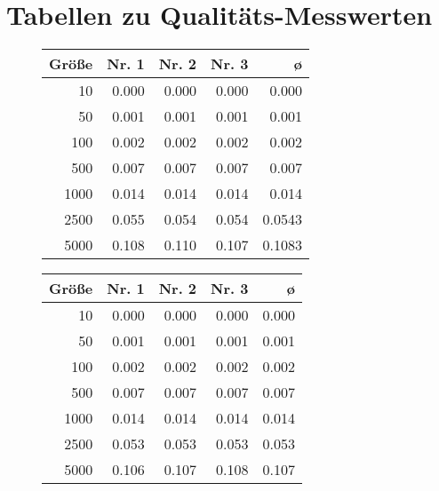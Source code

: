 \documentclass[a4paper, 10pt, twoside, onecolumn, parskip]{scrartcl}
\begin{document}
    \section{Tabellen zu Qualitäts-Messwerten} \label{sec:app_qualität2}
    \begin{figure}[H]
        \begin{minipage}{.45\textwidth}
            \begin{center}
                \begin{tabular}{|r|r|r|r|r|}
                    \hline
                    Größe & Nr. 1 & Nr. 2 & Nr. 3 & ø \\\hline
                    10 & 0.000 & 0.000 & 0.000 & 0.000 \\\hline
                    50 & 0.001 & 0.001 & 0.001 & 0.001 \\\hline
                    100 & 0.002 & 0.002 & 0.002 & 0.002 \\\hline
                    500 & 0.007 & 0.007 & 0.007 & 0.007 \\\hline
                    1000 & 0.014 & 0.014 & 0.014 & 0.014 \\\hline
                    2500 & 0.055 & 0.054 & 0.054 & 0.0543 \\\hline
                    5000 & 0.108 & 0.110 & 0.107 & 0.1083 \\\hline
                \end{tabular}
            \end{center}
        \end{minipage}\hfill%
        \begin{minipage}{.45\textwidth}
            \begin{center}
                \begin{tabular}{|r|r|r|r|r|}
                    \hline
                    Größe & Nr. 1 & Nr. 2 & Nr. 3 & ø \\\hline
                    10 & 0.000 & 0.000 & 0.000 & 0.000 \\\hline
                    50 & 0.001 & 0.001 & 0.001 & 0.001 \\\hline
                    100 & 0.002 & 0.002 & 0.002 & 0.002 \\\hline
                    500 & 0.007 & 0.007 & 0.007 & 0.007 \\\hline
                    1000 & 0.014 & 0.014 & 0.014 & 0.014 \\\hline
                    2500 & 0.053 & 0.053 & 0.053 & 0.053 \\\hline
                    5000 & 0.106 & 0.107 & 0.108 & 0.107 \\\hline
                \end{tabular}
            \end{center}
        \end{minipage}
    \end{figure}
    \fi

    \newpage
    \listoftables
    \printbibliography
\end{document}
